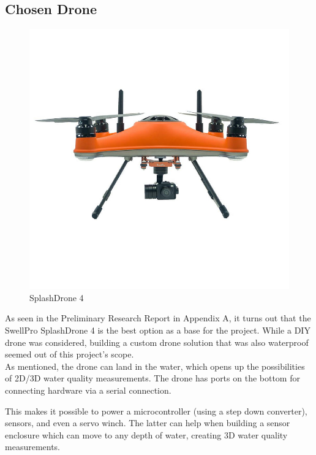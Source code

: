 \newpage
\subsection{Chosen Drone}
\begin{figure}
\includegraphics[width=1\linewidth]{070_design/chosendrone/21_splashdrone4.png}
\caption{SplashDrone 4 \cite{splashdrone4}}
\end{figure}
As seen in the Preliminary Research Report in Appendix A, \cite{prr} it turns out that the SwellPro SplashDrone 4 is the best option as a base for the project. While a \gls{DIY} drone was considered, building a custom drone solution that was also waterproof seemed out of this project's scope.\\

As mentioned, the drone can land in the water, which opens up the possibilities of \gls{2D}/\gls{3D} water quality measurements. The drone has ports on the bottom for connecting hardware via a serial connection. 

This makes it possible to power a microcontroller (using a step down converter), sensors, and even a servo winch. The latter can help when building a sensor enclosure which can move to any depth of water, creating \gls{3D} water quality measurements.

